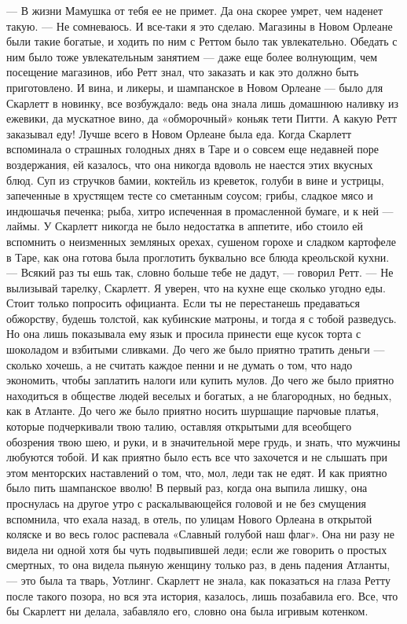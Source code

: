 — В жизни Мамушка от тебя ее не примет. Да она скорее умрет, чем наденет такую.
— Не сомневаюсь. И все-таки я это сделаю.
Магазины в Новом Орлеане были такие богатые, и ходить по ним с Реттом было так увлекательно. Обедать с ним было тоже увлекательным занятием — даже еще более волнующим, чем посещение магазинов, ибо Ретт знал, что заказать и как это должно быть приготовлено. И вина, и ликеры, и шампанское в Новом Орлеане — было для Скарлетт в новинку, все возбуждало: ведь она знала лишь домашнюю наливку из ежевики, да мускатное вино, да «обморочный» коньяк тети Питти. А какую Ретт заказывал еду! Лучше всего в Новом Орлеане была еда. Когда Скарлетт вспоминала о страшных голодных днях в Таре и о совсем еще недавней поре воздержания, ей казалось, что она никогда вдоволь не наестся этих вкусных блюд. Суп из стручков бамии, коктейль из креветок, голуби в вине и устрицы, запеченные в хрустящем тесте со сметанным соусом; грибы, сладкое мясо и индюшачья печенка; рыба, хитро испеченная в промасленной бумаге, и к ней — лаймы. У Скарлетт никогда не было недостатка в аппетите, ибо стоило ей вспомнить о неизменных земляных орехах, сушеном горохе и сладком картофеле в Таре, как она готова была проглотить буквально все блюда креольской кухни.
— Всякий раз ты ешь так, словно больше тебе не дадут, — говорил Ретт. — Не вылизывай тарелку, Скарлетт. Я уверен, что на кухне еще сколько угодно еды. Стоит только попросить официанта. Если ты не перестанешь предаваться обжорству, будешь толстой, как кубинские матроны, и тогда я с тобой разведусь.
Но она лишь показывала ему язык и просила принести еще кусок торта с шоколадом и взбитыми сливками.
До чего же было приятно тратить деньги — сколько хочешь, а не считать каждое пенни и не думать о том, что надо экономить, чтобы заплатить налоги или купить мулов. До чего же было приятно находиться в обществе людей веселых и богатых, а не благородных, но бедных, как в Атланте. До чего же было приятно носить шуршащие парчовые платья, которые подчеркивали твою талию, оставляя открытыми для всеобщего обозрения твою шею, и руки, и в значительной мере грудь, и знать, что мужчины любуются тобой. И как приятно было есть все что захочется и не слышать при этом менторских наставлений о том, что, мол, леди так не едят. И как приятно было пить шампанское вволю! В первый раз, когда она выпила лишку, она проснулась на другое утро с раскалывающейся головой и не без смущения вспомнила, что ехала назад, в отель, по улицам Нового Орлеана в открытой коляске и во весь голос распевала «Славный голубой наш флаг». Она ни разу не видела ни одной хотя бы чуть подвыпившей леди; если же говорить о простых смертных, то она видела пьяную женщину только раз, в день падения Атланты, — это была та тварь, Уотлинг. Скарлетт не знала, как показаться на глаза Ретту после такого позора, но вся эта история, казалось, лишь позабавила его. Все, что бы Скарлетт ни делала, забавляло его, словно она была игривым котенком.
